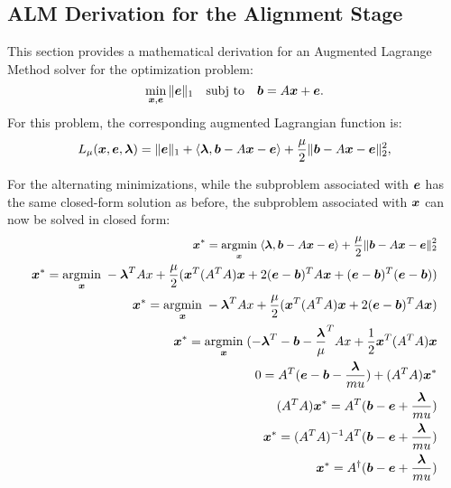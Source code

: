 \subsection{ALM Derivation for the Alignment Stage}
This section provides a mathematical derivation for an Augmented Lagrange Method solver
for the optimization problem:
\begin{equation}
\min_{\x, \e} \|\e\|_1 \quad \subj \quad \bb =
A \x + \e.
\end{equation}
For this problem, the corresponding augmented Lagrangian function is:
\begin{equation}
L_\mu (\x,\e,\blambda) = \|\e\|_1 + \langle \blambda, \bb-A\x - \e \rangle + \frac{\mu}{2} \|\bb - A\x - \e\|_2^2,
\end{equation}

For the alternating minimizations, while the subproblem associated with $\e$
has the same closed-form solution as before, the subproblem associated with
$\x$ can now be solved in closed form:
\begin{eqnarray}\small
\x^* = \argmin{\x} \langle \blambda, \bb-A\x - \e \rangle + \frac{\mu}{2} \|\bb - A\x - \e\|_2^2 \\
\x^* = \argmin{\x} -\blambda^T A x + \frac{\mu}{2} (\x^T(A^T A) \x + 2(\e-\bb)^T A \x + (\e-\bb)^T (\e-\bb)) \\
\x^* = \argmin{\x} -\blambda^T A x + \frac{\mu}{2} (\x^T(A^T A) \x + 2(\e-\bb)^T A \x) \\
\x^* = \argmin{\x} (-\blambda^T -\bb -\frac{\blambda}{\mu}^T A x + \frac{1}{2} \x^T (A^T A) \x \\
0 = A^T(\e - \bb -\frac{\blambda}{mu}) + (A^T A) \x^*\\
(A^T A) \x^* =  A^T (\bb - \e + \frac{\blambda}{mu})\\
\x^* =  (A^T A)^{-1} A^T (\bb - \e + \frac{\blambda}{mu})\\
\x^* =  A^\dagger (\bb - \e + \frac{\blambda}{mu})
\end{eqnarray}

